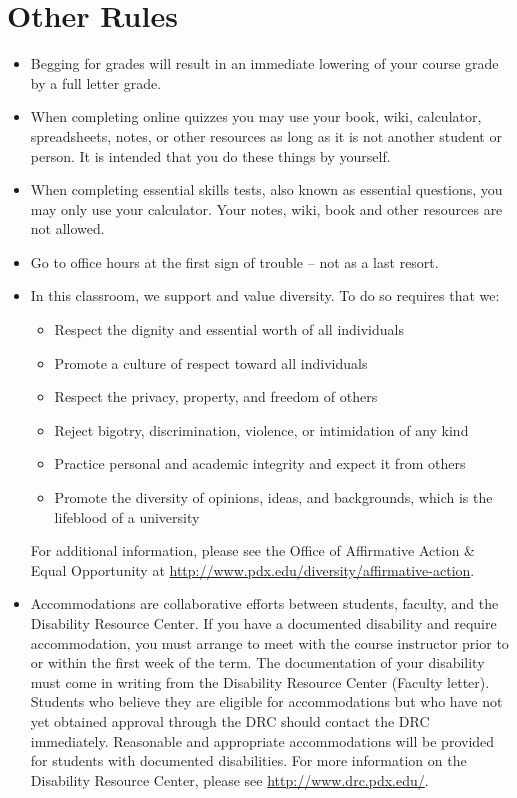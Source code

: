 \documentclass[letterpaper,10pt]{article}
\newif\ifonline
\begin{document}
\section{Other Rules}
\begin{itemize}


\item Begging for grades will result in an immediate lowering of your
  course grade by a full letter grade.
  
  \item When completing online quizzes you may use your book, wiki, calculator, spreadsheets, notes, or other resources as long as it is not another student or person.  It is intended that you do these things by yourself.
  
\ifonline

\else
   \item When completing essential skills tests, also known as essential questions, you may only use your calculator.  Your notes, wiki, book and other resources are not allowed.

\fi
\item Go to office hours at the first sign of trouble -- not as a last
  resort.

\item In this classroom, we support and value diversity.  To do so requires that we:
\begin{itemize}
   \item Respect the dignity and essential worth of all individuals
   \item Promote a culture of respect toward all individuals
    \item Respect the privacy, property, and freedom of others
    \item Reject bigotry, discrimination, violence, or intimidation of any kind
    \item Practice personal and academic integrity and expect it from others
   \item Promote the diversity of opinions, ideas, and backgrounds, which is
    the lifeblood of a university
\end{itemize}

 For additional information, please see the Office of Affirmative Action \& Equal Opportunity at \url{http://www.pdx.edu/diversity/affirmative-action}.


\item Accommodations are collaborative efforts between students, faculty, and the Disability Resource Center.  If you have a documented disability and require accommodation, you must arrange to meet with the course instructor prior to or within the first week of the term.  The documentation of your disability must come in writing from the Disability Resource Center (Faculty letter).  Students who believe they are eligible for accommodations but who have not yet obtained approval through the DRC should contact the DRC immediately.  Reasonable and appropriate accommodations will be provided for students with documented disabilities.  For more information on the Disability Resource Center, please see \url{http://www.drc.pdx.edu/}. 


\end{itemize}
\end{document}
